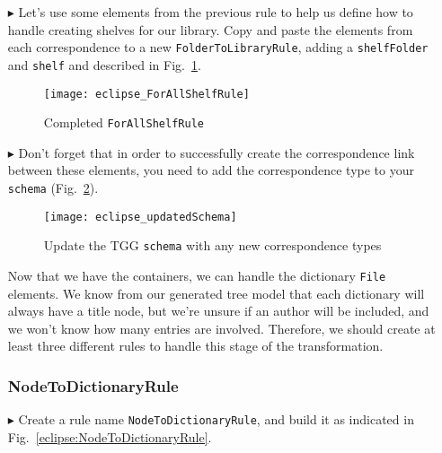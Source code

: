 \begin{itemize}
\item[$\blacktriangleright$] Let's use some elements from the previous rule to help us define how to handle creating shelves for our library. Copy and paste the
elements from each correspondence to a new \texttt{FolderToLibraryRule}, adding a \texttt{shelfFolder} and \texttt{shelf} and described in
Fig.~\ref{eclipse:ForAllShelvesRule}.

\vspace{0.5cm}

\begin{figure}[htbp]
\begin{center}
  \texttt{[image: eclipse\_ForAllShelfRule]}
  \caption{Completed \texttt{ForAllShelfRule}}
  \label{eclipse:ForAllShelvesRule}
\end{center}
\end{figure}

\item[$\blacktriangleright$] Don't forget that in order to successfully create the correspondence link between these elements, you need to add the
correspondence type to your \texttt{schema} (Fig.~\ref{eclipse:updatedSchema}).

\vspace{0.5cm}

\begin{figure}[h!]
\begin{center}
  \texttt{[image: eclipse\_updatedSchema]}
  \caption{Update the TGG \texttt{schema} with any new correspondence types}
  \label{eclipse:updatedSchema}
\end{center}
\end{figure}

\newpage

Now that we have the containers, we can handle the dictionary \texttt{File} elements. We know from our generated tree model that each dictionary will always
have a title node, but we're unsure if an author will be included, and we won't know how many entries are involved. Therefore, we should create at least three
different rules to handle this stage of the transformation. 

\subsubsection{NodeToDictionaryRule} %

\item[$\blacktriangleright$] Create a rule name \texttt{NodeToDictionaryRule}, and build it as indicated in Fig.~\ref{eclipse:NodeToDictionaryRule}.


\end{itemize}
